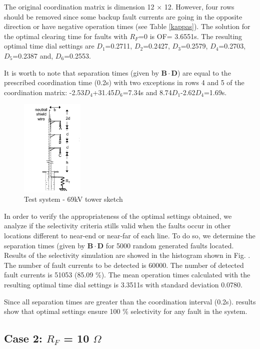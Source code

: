 \documentclass[letterpaper, 10 pt, conference]{IEEEtran}
\begin{document}
The original coordination matrix is dimension 12 $\times$ 12. However, four rows should be removed since some backup fault currents are going in the opposite direction or have negative operation times (see Table \ref{kappas}). The solution for the optimal clearing time for faults with $R_F$=0 is OF= 3.6551s. The resulting optimal time dial settings are   $D_1$=0.2711,
    $D_2$=0.2427,
    $D_3$=0.2579,
    $D_4$=0.2703,
    $D_5$=0.2387 and,
    $D_6$=0.2553.

It is worth to note that separation times (given by $\mathbf{B}\cdot \mathbf{D}$) are equal to the prescribed coordination time (0.2s) with two exceptions  in rows 4 and 5 of the coordination matrix: -2.53$D_4$+31.45$D_6$=7.34s and   8.74$D_1$-2.62$D_4$=1.69s.


     \begin{figure}[h] \centerline{
     \includegraphics[width=3.0cm]{images/figure3.pdf}}
       \caption{Test system - 69kV tower sketch}
      \label{figure3}
        \end{figure}
        
In order to verify the appropriateness of the optimal settings obtained, we analyze if the selectivity criteria stills valid when the faults occur in other locations different to near-end or near-far of each line. To do so, we  determine the separation times (given by $\mathbf{B}\cdot \mathbf{D}$ for 5000 random generated faults located. Results of the selectivity simulation are showed in the histogram shown in Fig. \label{figure5x}. The number of fault currents to be detected is 60000.
The number of detected fault currents is  51053 (85.09 \%). The mean operation times calculated with the resulting optimal time dial settings is 3.3511s with standard deviation
 0.0780.


        
        Since all separation times are greater than the coordination interval (0.2s). results show that optimal settings ensure 100 \% selectivity for any fault in the system.

\subsection{Case 2: $R_F$ = 10 $\Omega$}\label{2}
\end{document}
